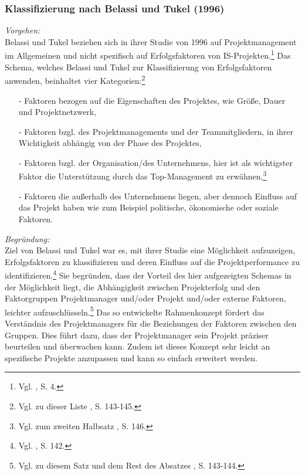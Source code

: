 \noindent
\subsubsection{Klassifizierung nach Belassi und Tukel (1996)}
\textit{Vorgehen:}\\\noindent
Belassi und Tukel beziehen sich in ihrer Studie von 1996 auf Projektmanagement im Allgemeinen und nicht spezifisch auf
Erfolgsfaktoren von IS-Projekten.\footnote{Vgl. \cite{vanScoter.2011}, S. 4.}
Das Schema, welches Belassi und Tukel zur Klassifizierung von Erfolgsfaktoren anwenden, beinhaltet vier Kategorien:\footnote{Vgl. zu dieser Liste \cite{Belassi.1996}, S. 143-145.}
\begin{itemize}\itemsep0pt
\item[-]Faktoren bezogen auf die Eigenschaften des Projektes, wie Größe, Dauer und Projektnetzwerk,
\item[-]Faktoren bzgl. des Projektmanagements und der Teammitgliedern, in ihrer Wichtigkeit abhängig von der Phase des Projektes,
\item[-]Faktoren bzgl. der Organisation/des Unternehmens, hier ist als wichtigster Faktor die Unterstützung durch das Top-Management zu erwähnen,\footnote{Vgl. zum zweiten Halbsatz \cite{Belassi.1996}, S. 146.}
\item[-]Faktoren die außerhalb des Unternehmens liegen, aber dennoch Einfluss auf das Projekt haben wie zum Beispiel politische, ökonomische oder soziale Faktoren.
\end{itemize}
\textit{Begründung:}\\\noindent
Ziel von Belassi und Tukel war es, mit ihrer Studie eine Möglichkeit aufzuzeigen, Erfolgsfaktoren zu klassifizieren und deren 
Einfluss auf die Projektperformance zu identifizieren.\footnote{Vgl. \cite{Belassi.1996}, S. 142.}
Sie begründen, dass der Vorteil des hier aufgezeigten Schemas in der Möglichkeit liegt, die Abhängigkeit zwischen Projekterfolg
und den Faktorgruppen Projektmanager und/oder Projekt und/oder externe Faktoren, leichter aufzuschlüsseln.\footnote{Vgl. zu diesem Satz und dem Rest des Absatzes \cite{Belassi.1996}, S. 143-144.}
Das so entwickelte Rahmenkonzept fördert das Verständnis des Projektmanagers für die Beziehungen der Faktoren zwischen den Gruppen. 
Dies führt dazu, dass der Projektmanager sein Projekt präziser beurteilen und überwachen kann. Zudem ist dieses Konzept sehr leicht an spezifische Projekte anzupassen und kann so einfach erweitert werden.
